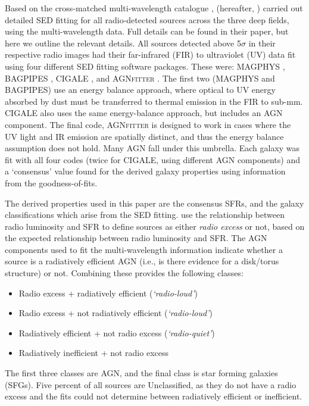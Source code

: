 \documentclass[usenatbib,fleqn,letters]{mnras}
\begin{document}
Based on the cross-matched multi-wavelength catalogue \cite{kondapally_lofar_2021}, \cite{best_lofar_2023} (hereafter, ) carried out detailed SED fitting for all radio-detected sources across the three deep fields, using the multi-wavelength data. Full details can be found in their paper, but here we outline the relevant details. All sources detected above 5$\sigma$ in their respective radio images had their far-infrared (FIR) to ultraviolet (UV) data fit using four different SED fitting software packages. These were: MAGPHYS \citep{da_cunha_simple_2008}, BAGPIPES \citep{carnall_inferring_2018,carnall_how_2019}, CIGALE \citep{burgarella_star_2005,noll_analysis_2009,boquien_cigale_2019}, and AGN\textsc{fitter} \citep{calistro_rivera_agnfitter_2016}. The first two (MAGPHYS and BAGPIPES) use an energy balance approach, where optical to UV energy absorbed by dust must be transferred to thermal emission in the FIR to sub-mm.  CIGALE also uses the same energy-balance approach, but includes an AGN component. The final code, AGN\textsc{fitter} is designed to work in cases where the UV light and IR emission are spatially distinct, and thus the energy balance assumption does not hold. Many AGN fall under this umbrella. Each galaxy was fit with all four codes (twice for CIGALE, using different AGN components) and a `consensus' value found for the derived galaxy properties using information from the goodness-of-fits.  

The derived properties used in this paper are the consensus SFRs, and the galaxy classifications which arise from the SED fitting.  use the relationship between radio luminosity and SFR to define sources as either \textit{radio excess} or not, based on the expected relationship between radio luminosity and SFR. The AGN components used to fit the multi-wavelength information indicate whether a source is a radiatively efficient AGN (i.e., is there evidence for a disk/torus structure) or not. Combining these provides the following classes:
\begin{itemize}
    \item Radio excess + radiatively efficient (\textit{`radio-loud'})
    \item Radio excess + not radiatively efficient (\textit{`radio-loud'})
    \item Radiatively efficient + not radio excess (\textit{`radio-quiet'})
    \item Radiatively inefficient + not radio excess
\end{itemize}
The first three classes are AGN, and the final class is star forming galaxies (SFGs).  Five percent of all sources are Unclassified, as they do not have a radio excess and the fits could not determine between radiatively efficient or inefficient. 
\end{document}
